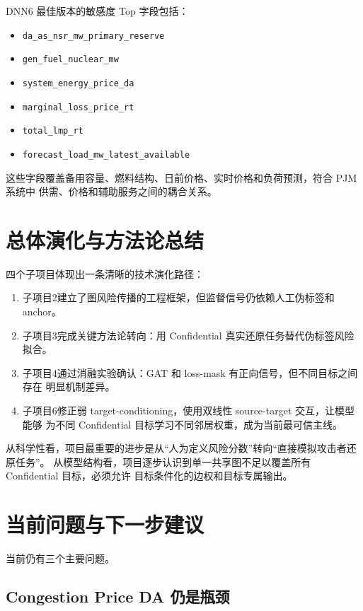 \documentclass[UTF8,a4paper,11pt]{ctexart}
\begin{document}
DNN6 最佳版本的敏感度 Top 字段包括：
\begin{itemize}
  \item \texttt{da\_as\_nsr\_mw\_primary\_reserve}
  \item \texttt{gen\_fuel\_nuclear\_mw}
  \item \texttt{system\_energy\_price\_da}
  \item \texttt{marginal\_loss\_price\_rt}
  \item \texttt{total\_lmp\_rt}
  \item \texttt{forecast\_load\_mw\_latest\_available}
\end{itemize}
这些字段覆盖备用容量、燃料结构、日前价格、实时价格和负荷预测，符合 PJM 系统中
供需、价格和辅助服务之间的耦合关系。

\section{总体演化与方法论总结}

四个子项目体现出一条清晰的技术演化路径：

\begin{enumerate}
  \item 子项目2建立了图风险传播的工程框架，但监督信号仍依赖人工伪标签和 anchor。
  \item 子项目3完成关键方法论转向：用 Confidential 真实还原任务替代伪标签风险拟合。
  \item 子项目4通过消融实验确认：GAT 和 loss-mask 有正向信号，但不同目标之间存在
  明显机制差异。
  \item 子项目6修正弱 target-conditioning，使用双线性 source-target 交互，让模型能够
  为不同 Confidential 目标学习不同邻居权重，成为当前最可信主线。
\end{enumerate}

从科学性看，项目最重要的进步是从``人为定义风险分数''转向``直接模拟攻击者还原任务''。
从模型结构看，项目逐步认识到单一共享图不足以覆盖所有 Confidential 目标，必须允许
目标条件化的边权和目标专属输出。

\section{当前问题与下一步建议}

当前仍有三个主要问题。

\subsection{Congestion Price DA 仍是瓶颈}
\end{document}
